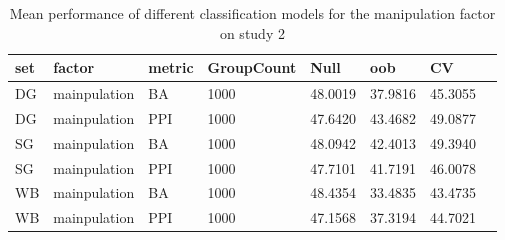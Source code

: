 \begin{table}
\centering
\begin{tabular}[0.2em]{@{}llllllll@{}}\toprule
set & factor & metric & GroupCount & Null & oob & CV\\\toprule[0.2em]
DG & mainpulation & BA & 1000 & 48.0019 & 37.9816 & 45.3055 \\\midrule
DG & mainpulation & PPI & 1000 & 47.6420 & 43.4682 & 49.0877 \\\midrule
SG & mainpulation & BA & 1000 & 48.0942 & 42.4013 & 49.3940 \\\midrule
SG & mainpulation & PPI & 1000 & 47.7101 & 41.7191 & 46.0078 \\\midrule
WB & mainpulation & BA & 1000 & 48.4354 & 33.4835 & 43.4735 \\\midrule
WB & mainpulation & PPI & 1000 & 47.1568 & 37.3194 & 44.7021 \\\bottomrule[0.2em]
\end{tabular}
\caption{Mean performance of different classification models for the manipulation factor on study 2\label{tabel:ClassificationmaniMeanPerf}}
\end{table}
